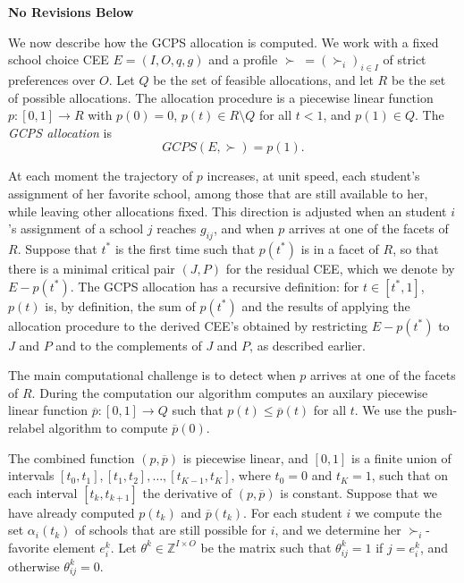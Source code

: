 \documentclass[12pt]{article}
\theoremstyle{definition}
\newcommand{\norev}{\medskip \centerline{\textbf{No Revisions Below}} \medskip}
\newcommand{\In}{\mathbb{Z}}
\newcommand{\barp}{\overline{p}}
\begin{document}
\begin{appendix}
\norev

We now describe how the GCPS allocation is computed.  We work with
a fixed school choice CEE $E = (I,O,q,g)$ and a profile $\succ \; =
(\succ_i)_{i \in I}$ of strict preferences over $O$. Let
$Q$ be the set of feasible allocations, and let $R$ be the set of
possible allocations. The allocation procedure is a piecewise linear function $p
\colon [0,1] \to R$ with $p(0) = 0$, $p(t) \in R \setminus Q$ for all
$t < 1$, and $p(1) \in Q$.  The \emph{GCPS allocation}
is $$GCPS(E,\succ) = p(1).$$

At each moment the trajectory of $p$ increases, at unit speed, each
student's assignment of her favorite school, among those that are
still available to her, while leaving other allocations fixed.  This
direction is adjusted when an student $i$'s assignment of a school $j$
reaches $g_{ij}$, and when $p$ arrives at one of the facets of $R$.
Suppose that $t^*$ is the first time such that $p(t^*)$ is in a facet
of $R$, so that there is a minimal critical pair $(J,P)$ for the
residual CEE, which we denote by $E - p(t^*)$. The GCPS allocation has
a recursive definition: for $t \in [t^*,1]$, $p(t)$ is, by definition,
the sum of $p(t^*)$ and the results of applying the allocation
procedure to the derived CEE's obtained by restricting $E - p(t^*)$ to
$J$ and $P$ and to the complements of $J$ and $P$, as described
earlier.

The main computational challenge is to detect when $p$ arrives at one
of the facets of $R$.  During the computation our algorithm computes
an auxilary piecewise linear function $\barp \colon [0,1] \to Q$ such
that $p(t) \le \barp(t)$ for all $t$.  We use the push-relabel
algorithm to compute $\barp(0)$.

The combined function $(p,\barp)$ is piecewise linear, and $[0,1]$ is
a finite union of intervals $[t_0,t_1], [t_1, t_2], \ldots, [t_{K-1},
  t_K]$, where $t_0 = 0$ and $t_K = 1$, such that on each interval
$[t_k,t_{k+1}]$ the derivative of $(p,\barp)$ is constant.  Suppose
that we have already computed $p(t_k)$ and $\barp(t_k)$.  For each
student $i$ we compute the set $\alpha_i(t_k)$ of schools that are still
possible for $i$, and we determine her $\succ_i$-favorite element
$e_i^k$.  Let $\theta^k \in \In^{I \times O}$ be the matrix such that
$\theta^k_{ij} = 1$ if $j = e_i^k$, and otherwise $\theta^k_{ij} = 0$.


\end{appendix}
\end{document}
